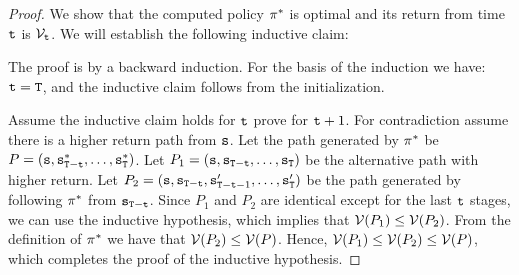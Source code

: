 \begin{proof}
We show that the computed policy $\pi^*$ is optimal and its
return from time ${\tt t}$ is $\mathcal{V}_{{\tt t}}$. We will establish
the following inductive claim:

\bigskip
{}

\bigskip
The proof is by a backward induction. For the basis of the induction
we have: ${\tt t}={\tt T}$, and the inductive claim follows from
the initialization.


Assume the inductive claim holds for ${\tt t}$ prove for ${\tt t}+1$.
For contradiction assume there is a higher return path from
${\tt s}$. Let the path generated by $\pi^*$ be
$P=({\tt s},{\tt s}^*_{{\tt T}-{\tt t}},\ldots,{\tt s}^*_{\tt T})$.
Let $P_1=({\tt s},{\tt s}_{{\tt T}-{\tt t}},\ldots,{\tt s}_{\tt T}
)$ be the alternative path with higher return. Let
$P_2=({\tt s},{\tt s}_{{\tt T}-{\tt t}},{\tt s}'_{{\tt T}-{\tt t}-1},
\ldots,{\tt s}'_{\tt T} )$ be the path generated by following
$\pi^*$ from ${\tt s}_{{\tt T}-{\tt t}}$. Since $P_1$ and $P_2$
are identical except for the last ${\tt t}$ stages, we can use the
inductive hypothesis, which implies that $\mathcal{V}(P_1)\leq
\mathcal{V}(P_2)$. From the definition of $\pi^*$ we have that
$\mathcal{V}(P_2)\leq \mathcal{V}(P)$. Hence, $\mathcal{V}(P_1)\leq \mathcal{V}(P_2)\leq
\mathcal{V}(P)$, which completes the proof of the inductive hypothesis.
%
\end{proof}

